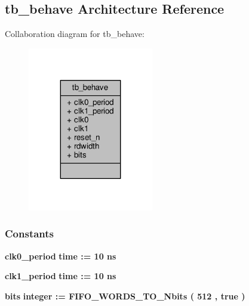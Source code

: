 \subsection{tb\+\_\+behave Architecture Reference}
\label{classFIFO__PACK__tb_1_1tb__behave}


Collaboration diagram for tb\+\_\+behave\+:\nopagebreak
\begin{figure}[H]
\begin{center}
\leavevmode
\includegraphics[width=155pt]{d3/d22/classFIFO__PACK__tb_1_1tb__behave__coll__graph}
\end{center}
\end{figure}
\subsubsection*{Constants}
 \begin{DoxyCompactItemize}
\item 
{\bf clk0\+\_\+period} {\bfseries \textcolor{comment}{time}\textcolor{vhdlchar}{ }\textcolor{vhdlchar}{ }\textcolor{vhdlchar}{\+:}\textcolor{vhdlchar}{=}\textcolor{vhdlchar}{ }\textcolor{vhdlchar}{ }\textcolor{vhdlchar}{ } \textcolor{vhdldigit}{10} \textcolor{vhdlchar}{ }\textcolor{vhdlchar}{ns}\textcolor{vhdlchar}{ }} 
\item 
{\bf clk1\+\_\+period} {\bfseries \textcolor{comment}{time}\textcolor{vhdlchar}{ }\textcolor{vhdlchar}{ }\textcolor{vhdlchar}{\+:}\textcolor{vhdlchar}{=}\textcolor{vhdlchar}{ }\textcolor{vhdlchar}{ }\textcolor{vhdlchar}{ } \textcolor{vhdldigit}{10} \textcolor{vhdlchar}{ }\textcolor{vhdlchar}{ns}\textcolor{vhdlchar}{ }} 
\item 
{\bf bits} {\bfseries \textcolor{comment}{integer}\textcolor{vhdlchar}{ }\textcolor{vhdlchar}{ }\textcolor{vhdlchar}{\+:}\textcolor{vhdlchar}{=}\textcolor{vhdlchar}{ }\textcolor{vhdlchar}{ }\textcolor{vhdlchar}{ }\textcolor{vhdlchar}{ }\textcolor{vhdlchar}{F\+I\+F\+O\+\_\+\+W\+O\+R\+D\+S\+\_\+\+T\+O\+\_\+\+Nbits}\textcolor{vhdlchar}{ }\textcolor{vhdlchar}{(}\textcolor{vhdlchar}{ }\textcolor{vhdlchar}{ } \textcolor{vhdldigit}{512} \textcolor{vhdlchar}{ }\textcolor{vhdlchar}{,}\textcolor{vhdlchar}{ }\textcolor{vhdlchar}{ }\textcolor{vhdlchar}{ }\textcolor{vhdlchar}{ }\textcolor{vhdlchar}{true}\textcolor{vhdlchar}{ }\textcolor{vhdlchar}{)}\textcolor{vhdlchar}{ }} 
\end{DoxyCompactItemize}
